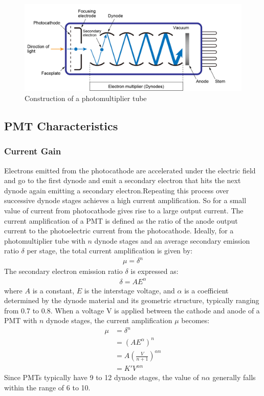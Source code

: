 \begin{figure}
    \centering
    \includegraphics[width=1\columnwidth]{images/pmt.png}
    \caption{Construction of a photomultiplier tube}
    \label{g1}
\end{figure}

\subsection{PMT Characteristics}

\subsubsection{Current Gain}
Electrons emitted from the photocathode are accelerated under the electric field and go to the first dynode and emit a secondary electron that hits the next dynode again emitting a secondary electron.Repeating this process over successive dynode stages achieves a high current amplification. So for a small value of current from photocathode gives rise to a large output current. The current amplification of a PMT is defined as the ratio of the anode output current to the photoelectric current from the photocathode. Ideally, for a photomultiplier tube with $n$ dynode stages and an average secondary emission ratio $\delta$ per stage, the total current amplification is given by:
\begin{align}\mu = \delta^n\end{align}
The secondary electron emission ratio $\delta$ is expressed as:
\begin{align}\delta = AE^\alpha\end{align}
where $A$ is a constant, $E$ is the interstage voltage, and $\alpha$ is a coefficient determined by the dynode material and its geometric structure, typically ranging from 0.7 to 0.8. When a voltage V is applied between the cathode and anode of a PMT with $n$ dynode stages, the current amplification $\mu$ becomes:
\begin{align}
    \mu &= \delta^n \nonumber\\ 
    &=(AE^\alpha)^n\nonumber\\
     &=A\left(\frac{V}{n+1}\right)^{\alpha n}\nonumber\\ 
     &=K'V^{\alpha n}
\end{align}
Since PMTs typically have 9 to 12 dynode stages, the value of $n \alpha$ generally falls within the range of 6 to 10.

